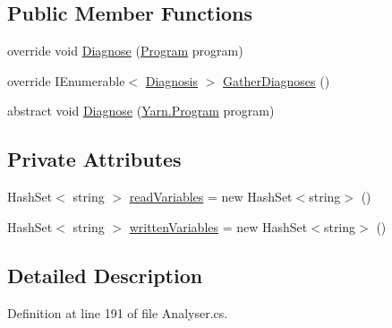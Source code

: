 \subsection*{Public Member Functions}
\begin{DoxyCompactItemize}
\item 
override void \hyperlink{a00165_aeac8f333d4dcc85f4d4a716bf8fea01f}{Diagnose} (\hyperlink{a00140}{Program} program)
\item 
override I\-Enumerable$<$ \hyperlink{a00089}{Diagnosis} $>$ \hyperlink{a00165_a107aecf707b130c4b733930a95f9154e}{Gather\-Diagnoses} ()
\item 
abstract void \hyperlink{a00052_aba4a36cb823b11ee491074e26477d084}{Diagnose} (\hyperlink{a00140}{Yarn.\-Program} program)
\end{DoxyCompactItemize}
\subsection*{Private Attributes}
\begin{DoxyCompactItemize}
\item 
Hash\-Set$<$ string $>$ \hyperlink{a00165_a6b542092ddce1b92c9455d60899518a9}{read\-Variables} = new Hash\-Set$<$string$>$ ()
\item 
Hash\-Set$<$ string $>$ \hyperlink{a00165_a0c2fe6eded1b10b135ca2469f5980a39}{written\-Variables} = new Hash\-Set$<$string$>$ ()
\end{DoxyCompactItemize}


\subsection{Detailed Description}


Definition at line 191 of file Analyser.\-cs.



